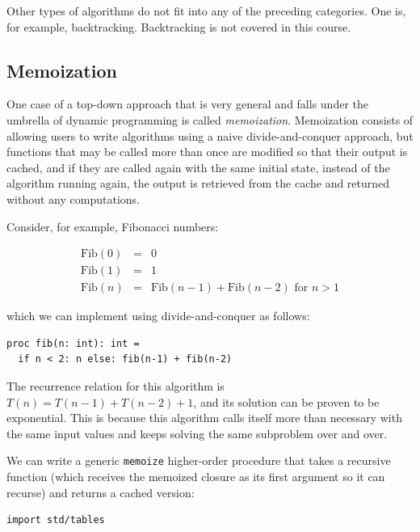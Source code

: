 \documentclass[justified, sixbynine]{tufte-book}
\def\ft{\small\tt}
\theoremstyle{plain}%
\newtheorem * {corollary}{Corollary}
\theoremstyle{definition}
\theoremstyle{remark}
\newtheorem * {remark}{Remark}
\newtheorem * {note}{Note}
\begin{document}
\begin{fullwidth}
Other types of algorithms do not fit into any of the preceding
categories. One is, for example, backtracking. Backtracking is not covered
in this course.

\goodbreak\subsection{Memoization}


One case of a top-down approach that is very general and falls under the umbrella of dynamic programming is called {\it memoization}. Memoization consists of allowing users to write algorithms using a naive divide-and-conquer approach, but functions that may be called more than once are modified so that their output is cached, and if they are called again with the same initial state, instead of the algorithm running again, the output is retrieved from the cache and returned without any computations.


Consider, for example, Fibonacci numbers:

\begin{eqnarray}
\textrm{Fib}(0)&=&0\\
\textrm{Fib}(1)&=&1\\
\textrm{Fib}(n)&=&\textrm{Fib}(n-1)+\textrm{Fib}(n-2)\textrm{ for }n>1
\end{eqnarray}

which we can implement using divide-and-conquer as follows:

\begin{lstlisting}
proc fib(n: int): int =
  if n < 2: n else: fib(n-1) + fib(n-2)
\end{lstlisting}

The recurrence relation for this algorithm is $T(n)=T(n-1)+T(n-2)+1$, and its solution can be proven to be exponential. This is because this algorithm calls itself more than necessary with the same input values and keeps solving the same subproblem over and over.


We can write a generic {\ft memoize} higher-order procedure that takes a recursive function (which receives the memoized closure as its first argument so it can recurse) and returns a cached version:
\begin{lstlisting}[caption={in file: {\ft nlib.nim}}]
import std/tables


\end{lstlisting}
\end{fullwidth}
\end{document}
